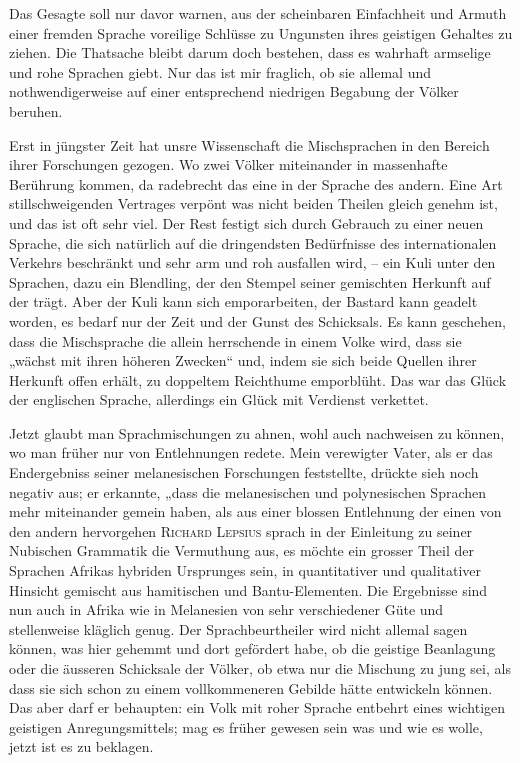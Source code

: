 Das Gesagte soll nur davor warnen, aus der scheinbaren Einfachheit und Armuth einer fremden Sprache voreilige Schlüsse zu Ungunsten ihres geistigen Gehaltes zu ziehen. Die Thatsache bleibt darum doch bestehen, dass es wahrhaft armselige und rohe Sprachen giebt. Nur das ist mir fraglich, ob sie allemal und nothwendigerweise auf einer entsprechend niedrigen Begabung der Völker beruhen.

\largerpage
Erst in jüngster Zeit hat unsre Wissenschaft die Mischsprachen in den Bereich ihrer Forschungen gezogen. Wo zwei Völker miteinander in massenhafte Berührung kommen, da radebrecht das eine in der Sprache des andern. Eine Art stillschweigenden Vertrages verpönt  was nicht beiden Theilen gleich genehm ist, und das ist oft sehr viel. Der Rest festigt sich durch Gebrauch zu einer neuen Sprache, die sich natür\label{fp.387}lich auf die dringendsten Bedürfnisse des internationalen Verkehrs beschränkt und sehr arm und roh ausfallen wird, – ein Kuli unter den Sprachen, dazu ein Blendling, der den Stempel seiner gemischten Herkunft auf der  trägt. Aber der Kuli kann sich emporarbeiten, der Bastard kann geadelt worden, es bedarf nur der Zeit und der Gunst des Schicksals. Es kann geschehen, dass die Mischsprache die allein herrschende in einem Volke wird, dass sie „wächst mit ihren höheren Zwecken“ und, indem sie sich beide Quellen ihrer Herkunft offen erhält, zu doppeltem Reichthume emporblüht. Das war das Glück der englischen Sprache, allerdings ein Glück mit Verdienst verkettet.

Jetzt glaubt man Sprachmischungen zu ahnen, wohl auch nachweisen zu können, wo man früher nur von Entlehnungen redete. Mein verewigter Vater, als er das Endergebniss seiner melanesischen Forschungen feststellte, drückte sieh noch negativ aus; er erkannte, „dass die melanesischen und polynesischen Sprachen mehr miteinander gemein haben, als aus einer blossen Entlehnung der einen von den andern hervorgehen  \textsc{Richard Lepsius} sprach in der Einleitung zu seiner Nubischen Grammatik die Vermuthung aus, es möchte ein grosser Theil der Sprachen Afrikas hybriden Ursprunges sein, in quantitativer und qualitativer Hinsicht  gemischt aus hamitischen und Bantu-Elementen. Die Ergebnisse sind nun auch in Afrika wie in Melanesien von sehr verschiedener Güte und stellenweise kläglich genug. Der Sprachbeurtheiler wird nicht allemal sagen können, was hier gehemmt und dort gefördert habe, ob die geistige Beanlagung oder die äusseren Schicksale der Völker, ob etwa nur die Mischung zu jung sei, als dass sie sich schon zu einem vollkommeneren Gebilde hätte entwickeln \label{sp.407} können. Das aber darf er behaupten: ein Volk mit roher Sprache entbehrt eines wichtigen geistigen Anregungsmittels; mag es früher gewesen sein was und wie es wolle, jetzt ist es zu beklagen.

